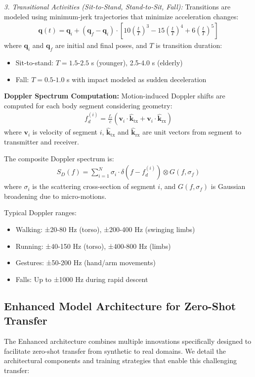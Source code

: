 \documentclass[journal]{IEEEtran}
\begin{document}
\textit{3. Transitional Activities (Sit-to-Stand, Stand-to-Sit, Fall):}
Transitions are modeled using minimum-jerk trajectories that minimize acceleration changes:
\begin{align}
\mathbf{q}(t) = \mathbf{q}_i + (\mathbf{q}_f - \mathbf{q}_i) \cdot \left[10\left(\frac{t}{T}\right)^3 - 15\left(\frac{t}{T}\right)^4 + 6\left(\frac{t}{T}\right)^5\right]
\end{align}
where $\mathbf{q}_i$ and $\mathbf{q}_f$ are initial and final poses, and $T$ is transition duration:
\begin{itemize}
\item Sit-to-stand: $T = 1.5\text{-}2.5$ s (younger), 2.5-4.0 s (elderly)
\item Fall: $T = 0.5\text{-}1.0$ s with impact modeled as sudden deceleration
\end{itemize}

\textbf{Doppler Spectrum Computation:}
Motion-induced Doppler shifts are computed for each body segment considering geometry:
\begin{align}
f_d^{(i)} = \frac{f_c}{c} (\mathbf{v}_i \cdot \hat{\mathbf{k}}_{\text{tx}} + \mathbf{v}_i \cdot \hat{\mathbf{k}}_{\text{rx}})
\end{align}
where $\mathbf{v}_i$ is velocity of segment $i$, $\hat{\mathbf{k}}_{\text{tx}}$ and $\hat{\mathbf{k}}_{\text{rx}}$ are unit vectors from segment to transmitter and receiver.

The composite Doppler spectrum is:
\begin{align}
S_D(f) = \sum_{i=1}^{N} \sigma_i \cdot \delta(f - f_d^{(i)}) \otimes G(f, \sigma_f)
\end{align}
where $\sigma_i$ is the scattering cross-section of segment $i$, and $G(f, \sigma_f)$ is Gaussian broadening due to micro-motions.

Typical Doppler ranges:
\begin{itemize}
\item Walking: ±20-80 Hz (torso), ±200-400 Hz (swinging limbs)
\item Running: ±40-150 Hz (torso), ±400-800 Hz (limbs)
\item Gestures: ±50-200 Hz (hand/arm movements)
\item Falls: Up to ±1000 Hz during rapid descent
\end{itemize}

\subsection{Enhanced Model Architecture for Zero-Shot Transfer}
The Enhanced architecture combines multiple innovations specifically designed to facilitate zero-shot transfer from synthetic to real domains. We detail the architectural components and training strategies that enable this challenging transfer:
\end{document}
